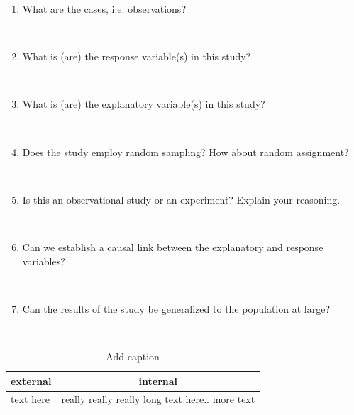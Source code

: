 \documentclass[12pt]{article}
\newcommand{\soln}[2]{$\:$\\ \vspace{#1}}{}
\begin{document}
\begin{enumerate}

\item What are the cases, i.e. observations?

\soln{1cm}{200 men and women}

\item What is (are) the response variable(s) in this study?

\soln{1cm}{Attitude towards the microwave oven}

\pagebreak

\item What is (are) the explanatory variable(s) in this study?

\soln{1cm}{Whether the participant is a hater or not}

\item Does the study employ random sampling? How about random assignment?

\soln{1cm}{Via Amazon's MTurk - self selected sample, no random assignment}

\item Is this an observational study or an experiment? Explain your reasoning.

\soln{1cm}{Observational, doesn't use random assignment}

\item Can we establish a causal link between the explanatory and response variables?

\soln{1cm}{No}

\item Can the results of the study be generalized to the population at large?

\soln{1cm}{No}

\end{enumerate}


\begin{table}[htbp]
  \centering
  \caption{Add caption}
    \begin{tabular}{lp{12em}}
    \toprule
    \multicolumn{1}{c}{external} & \multicolumn{1}{c}{internal } \\
    \midrule
    text here & really really really long text here.. more text \\
    \bottomrule
    \end{tabular}%
  \label{tab:addlabel}%
\end{table}%
\end{document}
